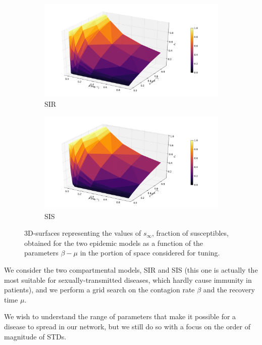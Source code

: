 \documentclass[a4paper,11pt, twocolumn]{article}
\begin{document}
\begin{figure}[H]
\begin{subfigure}[t]{0.49\textwidth}
\centering
\includegraphics[width=\textwidth]{./Figure/SIR/S_inf_surface.pdf}
\caption{SIR}
\label{grid_SIR}
\end{subfigure}
\begin{subfigure}[t]{0.49\textwidth}
\centering
\includegraphics[width=\textwidth]{./Figure/SIS/S_inf_surface.pdf}
\caption{SIS}
\label{grid_SIS}
\end{subfigure}
\caption{3D-surfaces representing the values of $s_{\infty}$, fraction of susceptibles, obtained for the two epidemic models as a function of the parameters $\beta - \mu$ in the portion of space considered for tuning.}
\end{figure}

We consider the two compartmental models, SIR and SIS (this one is actually the most suitable for sexually-transmitted diseases, which hardly cause immunity in patients), and we perform a grid search on the contagion rate $\beta$ and the recovery time $\mu$.

We wish to understand the range of parameters that make it possible for a disease to spread in our network, but we still do so with a focus on the order of magnitude of STDs.
\end{document}
